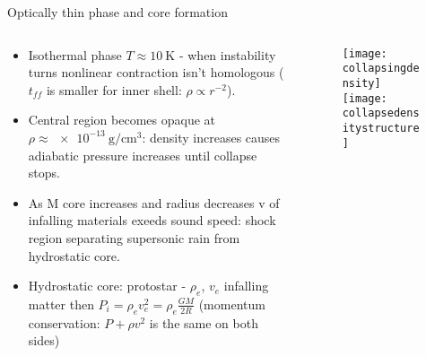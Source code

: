 \begin{frame}{Optically thin phase and core formation}
\begin{columns}[T]
\begin{column}{0.55\textwidth}
\begin{itemize}
	\item Isothermal phase $T\approx\SI{10}{\kelvin}$ - when instability turns nonlinear contraction isn't homologous ($t_{ff}$ is smaller for inner shell: $\rho\propto r^{-2}$).
	\item Central region becomes opaque at $\rho\approx\SI{e-13}{\gram\per\cubic\cm}$: density increases causes adiabatic pressure increases until collapse stops.
	\item As M core increases and radius decreases v of infalling materials exeeds sound speed: shock region separating supersonic rain from hydrostatic core.
	\item Hydrostatic core: protostar - $\rho_e$, $v_e$ infalling matter then $P_i=\rho_ev_e^2=\rho_e\frac{GM}{2R}$ (momentum conservation: $P+\rho v^2$ is the same on both sides) 
\end{itemize}
\end{column}
\begin{column}{0.45\textwidth}
\begin{figure}[!ht]
\texttt{[image: collapsingdensity]}\label{fig:collapsingdensity}
\texttt{[image: collapsedensitystructure]}\label{fig:collapsedensitystructure}
\end{figure}
\end{column}
\end{columns}
\end{frame}


